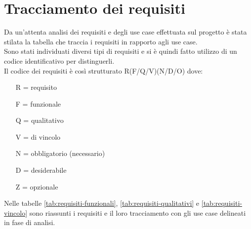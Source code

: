 \section{Tracciamento dei requisiti}
Da un'attenta analisi dei requisiti e degli use case effettuata sul progetto è stata stilata la tabella che traccia i requisiti in rapporto agli use case.\\
Sono stati individuati diversi tipi di requisiti e si è quindi fatto utilizzo di un codice identificativo per distinguerli.\\
Il codice dei requisiti è così strutturato R(F/Q/V)(N/D/O) dove:
\begin{enumerate}[nolistsep]
	\item[R =] requisito
    \item[F =] funzionale
    \item[Q =] qualitativo
    \item[V =] di vincolo
    \item[N =] obbligatorio (necessario)
    \item[D =] desiderabile
    \item[Z =] opzionale
\end{enumerate}
Nelle tabelle \ref{tab:requisiti-funzionali}, \ref{tab:requisiti-qualitativi} e \ref{tab:requisiti-vincolo} sono riassunti i requisiti e il loro tracciamento con gli use case delineati in fase di analisi.





